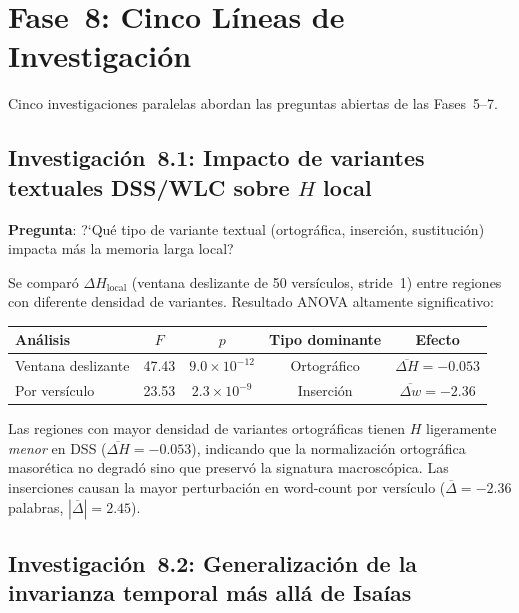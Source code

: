 \documentclass[12pt,a4paper]{article}
\begin{document}
\section{Fase~8: Cinco L\'ineas de Investigaci\'on}

Cinco investigaciones paralelas abordan las preguntas abiertas de las Fases~5--7.

\subsection{Investigaci\'on~8.1: Impacto de variantes textuales DSS/WLC sobre $H$ local}

\noindent\textbf{Pregunta}: ?`Qu\'e tipo de variante textual (ortogr\'afica, inserci\'on,
sustituci\'on) impacta m\'as la memoria larga local?

Se compar\'o $\Delta H_{\text{local}}$ (ventana deslizante de 50 vers\'iculos, stride~1)
entre regiones con diferente densidad de variantes. Resultado ANOVA altamente significativo:

\begin{center}
\begin{tabular}{lcccc}
\toprule
\textbf{An\'alisis} & \textbf{$F$} & \textbf{$p$} & \textbf{Tipo dominante} & \textbf{Efecto} \\
\midrule
Ventana deslizante & 47.43 & $9.0 \times 10^{-12}$ & Ortogr\'afico & $\overline{\Delta H} = -0.053$ \\
Por vers\'iculo     & 23.53 & $2.3 \times 10^{-9}$  & Inserci\'on   & $\overline{\Delta w} = -2.36$ \\
\bottomrule
\end{tabular}
\end{center}

\noindent
Las regiones con mayor densidad de variantes ortogr\'aficas tienen $H$ ligeramente
\emph{menor} en DSS ($\overline{\Delta H} = -0.053$), indicando que la normalizaci\'on
ortogr\'afica masor\'etica no degrad\'o sino que preserv\'o la signatura macrosc\'opica.
Las inserciones causan la mayor perturbaci\'on en word-count por vers\'iculo
($\overline{\Delta} = -2.36$ palabras, $|\overline{\Delta}| = 2.45$).

\subsection{Investigaci\'on~8.2: Generalizaci\'on de la invarianza temporal m\'as all\'a de Isa\'ias}
\end{document}
